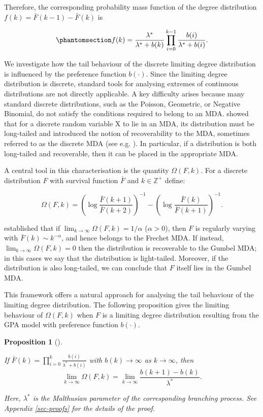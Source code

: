 \documentclass[
  sn-basic,
]{sn-jnl}
\theoremstyle{plain}
\theoremstyle{plain}
\newtheorem{proposition}{Proposition}[section]
\theoremstyle{remark}
\begin{document}
Therefore, the corresponding probability mass function of the degree
distribution \(f(k) = \bar F(k-1) - \bar F(k)\) is

\begin{equation}\phantomsection\label{eq-pmf-origin}{
f(k) = \frac{\lambda^*}{\lambda^* + b(k)}\prod_{i=0}^{k-1}\frac{b(i)}{\lambda^*+b(i)}.
}\end{equation}

We investigate how the tail behaviour of the discrete limiting degree
distribution is influenced by the preference function \(b(·)\). Since
the limiting degree distribution is discrete, standard tools for
analysing extremes of continuous distributions are not directly
applicable. A key difficulty arises because many standard discrete
distributions, such as the Poisson, Geometric, or Negative Binomial, do
not satisfy the conditions required to belong to an MDA.
\citet{shimura12} showed that for a discrete random variable X to lie in
an MDA, its distribution must be long-tailed and introduced the notion
of recoverability to the MDA, sometimes referred to as the discrete MDA
(see e.g. \citet{hitz24}). In particular, if a distribution is both
long-tailed and recoverable, then it can be placed in the appropriate
MDA.

A central tool in this characterisation is the quantity \(\Omega(F,k)\).
For a discrete distribution \(F\) with survival function \(\bar F\) and
\(k\in\mathbb Z^+\) define:

\[
\Omega(F,k) = \left(\log\displaystyle\frac{\bar F (k+1)}{\bar F (k+2)}\right)^{-1} - \left(\log\displaystyle\frac{\bar F (k)}{\bar F (k+1)}\right)^{-1}.
\]

\citet{shimura12} established that if
\(\lim_{k\rightarrow\infty} \Omega(F,k) = 1/\alpha\) (\(\alpha>0\)),
then \(F\) is regularly varying with \(\bar F(k) \sim k^{-\alpha}\), and
hence belongs to the Frechet MDA. If instead,
\(\lim_{k\rightarrow\infty} \Omega(F,k) = 0\) then the distribution is
recoverable to the Gumbel MDA; in this cases we say that the
distribution is light-tailed. Moreover, if the distribution is also
long-tailed, we can conclude that \(F\) itself lies in the Gumbel MDA.

This framework offers a natural approach for analysing the tail
behaviour of the limiting degree distribution. The following proposition
gives the limiting behaviour of \(\Omega(F,k)\) when \(F\) is a limiting
degree distribution resulting from the GPA model with preference
function \(b(\cdot)\).

\begin{proposition}[]\protect\hypertarget{prp-omega}{}\label{prp-omega}

If \(\bar F(k) = \prod_{i=0}^k\frac{b(i)}{\lambda^* + b(i)}\) with
\(b(k) \rightarrow \infty\) as \(k\rightarrow \infty\), then \[
\lim_{k\rightarrow\infty}\Omega(F,k) = \lim_{k\rightarrow\infty}\frac{b(k+1)-b(k)}{\lambda^*}.
\]

Here, \(\lambda^*\) is the Malthusian parameter of the corresponding
branching process. See Appendix \ref{sec-proofs} for the details of the
proof.

\end{proposition}
\end{document}
